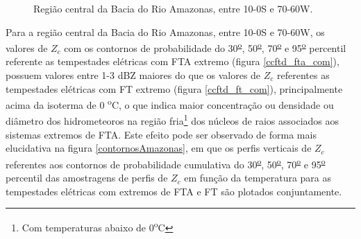\begin{figure}[!ht]
  \centering
  \caption{Região central da Bacia do Rio Amazonas, entre 10-0S e 70-60W.}
  \label{deriv_amazonas}  
\end{figure} 

Para a região central da Bacia do Rio Amazonas, entre 10-0S e 70-60W, os valores de $Z_c$ com os contornos de probabilidade do 30\textsuperscript{\underline{o}}, 50\textsuperscript{\underline{o}}, 70\textsuperscript{\underline{o}} e 95\textsuperscript{\underline{o}} percentil referente as tempestades elétricas com FTA extremo (figura \ref{ccftd_fta_com}), possuem valores entre 1-3 dBZ maiores do que os valores de $Z_c$ referentes as tempestades elétricas com FT extremo (figura \ref{ccftd_ft_com}), principalmente acima da isoterma de 0 \textsuperscript{o}C, o que indica maior concentração ou densidade ou diâmetro dos hidrometeoros na região fria\footnote{Com temperaturas abaixo de  0\textsuperscript{o}C} dos núcleos de raios associados aos sistemas extremos de FTA. Este efeito pode ser observado de forma mais elucidativa na figura \ref{contornosAmazonas}, em que os perfis verticais de $Z_c$ referentes aos contornos de probabilidade cumulativa do 30\textsuperscript{\underline{o}}, 50\textsuperscript{\underline{o}}, 70\textsuperscript{\underline{o}} e 95\textsuperscript{\underline{o}} percentil das amostragens de perfis de $Z_c$ em função da temperatura  para as tempestades elétricas com extremos de FTA e FT são plotados conjuntamente.

